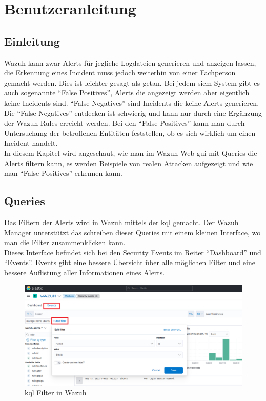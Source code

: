 \chapter{Benutzeranleitung}
\section{Einleitung}
Wazuh kann zwar Alerts für jegliche Logdateien generieren und anzeigen lassen, die Erkennung eines Incident muss jedoch weiterhin von einer Fachperson gemacht werden.
Dies ist leichter gesagt als getan.
Bei jedem \acrshort{siem} System gibt es auch sogenannte ``False Positives'', Alerts die angezeigt werden aber eigentlich keine Incidents sind. ``False Negatives'' sind Incidents die keine Alerts generieren.
Die ``False Negatives'' entdecken ist schwierig und kann nur durch eine Ergänzung der Wazuh Rules erreicht werden.
Bei den ``False Positives'' kann man durch Untersuchung der betroffenen Entitäten feststellen, ob es sich wirklich um einen Incident handelt.\\

In diesem Kapitel wird angeschaut, wie man im Wazuh Web \acrshort{gui} mit Queries die Alerts filtern kann, es werden Beispiele von realen Attacken aufgezeigt und wie man ``False Positives'' erkennen kann.

\section{Queries}
Das Filtern der Alerts wird in Wazuh mittels der \acrfull{kql} gemacht.
Der Wazuh Manager unterstützt das schreiben dieser Queries mit einem kleinen Interface, wo man die Filter zusammenklicken kann.\\

Dieses Interface befindet sich bei den Security Events im Reiter ``Dashboard'' und ``Events''.
Events gibt eine bessere Übersicht über alle möglichen Filter und eine bessere Auflistung aller Informationen eines Alerts.
\begin{figure}[H]
    \centering
    \includegraphics[width=\linewidth]{../img/filter.png}
    \caption{\acrshort{kql} Filter in Wazuh}
\end{figure}

